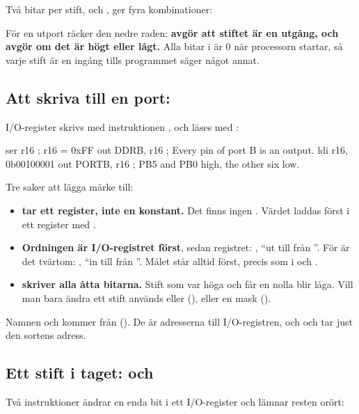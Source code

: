 \noindent Två bitar per stift,  och , ger fyra kombinationer:


För en utport räcker den nedre raden: \textbf{ avgör att stiftet är en utgång, och
 avgör om det är högt eller lågt.} Alla bitar i  är 0 när processorn
startar, så varje stift är en ingång tills programmet säger något annat.

\subsection{Att skriva till en port: }
\label{c8:c3}
I/O-register skrivs med instruktionen \textbf{}, och läses med \textbf{}:

\begin{asmcode}
    ser r16                         ; r16 = 0xFF
    out DDRB, r16                   ; Every pin of port B is an output.
    ldi r16, 0b00100001
    out PORTB, r16                  ; PB5 and PB0 high, the other six low.
\end{asmcode}

\noindent Tre saker att lägga märke till:
\begin{itemize}
  \item \textbf{ tar ett register, inte en konstant.} Det finns ingen
    . Värdet laddas först i ett register med .
  \item \textbf{Ordningen är I/O-registret först}, sedan registret: ,
    \enquote{ut till  från }. För  är det tvärtom:
    , \enquote{in till  från }. Målet står alltid först,
    precis som i  och .
  \item \textbf{ skriver alla åtta bitarna.} Stift som var höga och får en nolla blir
    låga. Vill man bara ändra ett stift används  eller  (), eller
    en mask ().
\end{itemize}

Namnen  och  kommer från  (). De är
adresserna till I/O-registren, och  och  tar just den sortens adress.

\subsection{Ett stift i taget:  och }
\label{c8:c4}
Två instruktioner ändrar en enda bit i ett I/O-register och lämnar resten orört:

